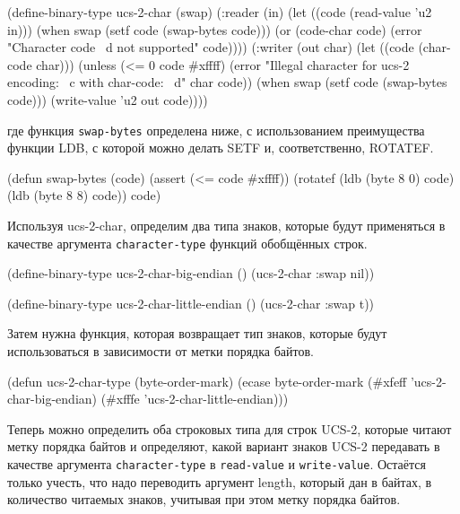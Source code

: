 \begin{myverb}
(define-binary-type ucs-2-char (swap)
  (:reader (in)
    (let ((code (read-value 'u2 in)))
      (when swap (setf code (swap-bytes code)))
      (or (code-char code) (error "Character code ~d not supported" code))))
  (:writer (out char)
    (let ((code (char-code char)))
      (unless (<= 0 code #xffff)
        (error "Illegal character for ucs-2 encoding: ~c with char-code: ~d" char code))
      (when swap (setf code (swap-bytes code)))
      (write-value 'u2 out code))))
\end{myverb}

\noindent{}где функция \lstinline{swap-bytes} определена ниже, с использованием преимущества функции LDB, с
которой можно делать SETF и, соответственно, ROTATEF.  

\begin{myverb}
(defun swap-bytes (code)
  (assert (<= code #xffff))
  (rotatef (ldb (byte 8 0) code) (ldb (byte 8 8) code))
  code)
\end{myverb}

Используя ucs-2-char, определим два типа знаков, которые будут применяться в качестве
аргумента \lstinline{character-type} функций обобщённых строк.

\begin{myverb}
(define-binary-type ucs-2-char-big-endian () (ucs-2-char :swap nil))

(define-binary-type ucs-2-char-little-endian () (ucs-2-char :swap t))
\end{myverb}

Затем нужна функция, которая возвращает тип знаков, которые будут использоваться в
зависимости от метки порядка байтов.

\begin{myverb}
(defun ucs-2-char-type (byte-order-mark)
  (ecase byte-order-mark
    (#xfeff 'ucs-2-char-big-endian)
    (#xfffe 'ucs-2-char-little-endian)))
\end{myverb}

Теперь можно определить оба строковых типа для строк UCS-2,
которые читают метку порядка байтов и определяют, какой вариант знаков UCS-2 передавать в
качестве аргумента \lstinline{character-type} в \lstinline{read-value} и \lstinline{write-value}.  Остаётся только учесть, 
что надо переводить аргумент length, который дан в байтах, в количество
читаемых знаков, учитывая при этом метку порядка байтов.

